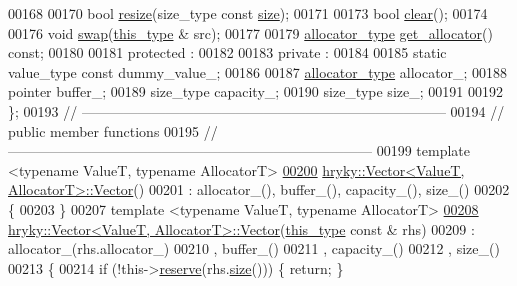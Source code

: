 \begin{DoxyCode}
00168 
00170     \textcolor{keywordtype}{bool} \hyperlink{classhryky_1_1_vector_a9148eb8972b43ed3a7e807d19be848a5}{resize}(size\_type \textcolor{keyword}{const} \hyperlink{classhryky_1_1_vector_a4bf9016a68dd7bf4967bf202b884a4fa}{size});
00171 
00173     \textcolor{keywordtype}{bool} \hyperlink{classhryky_1_1_vector_a674ecb00d223d91ba58bb45540be9983}{clear}();
00174 
00176     \textcolor{keywordtype}{void} \hyperlink{classhryky_1_1_vector_abcf365626457abf95d05b0a736e7a60a}{swap}(\hyperlink{classhryky_1_1_vector}{this_type} & src);
00177 
00179     \hyperlink{classhryky_1_1allocator_1_1_heap}{allocator_type} \hyperlink{classhryky_1_1_vector_a435d9e9b71aaf09e9281e671742ba2e0}{get_allocator}() \textcolor{keyword}{const};
00180 
00181 \textcolor{keyword}{protected} :
00182 
00183 \textcolor{keyword}{private} :
00184 
00185     \textcolor{keyword}{static} value\_type \textcolor{keyword}{const} dummy\_value\_;
00186 
00187     \hyperlink{classhryky_1_1allocator_1_1_heap}{allocator_type}      allocator\_;
00188     pointer             buffer\_;
00189     size\_type           capacity\_;
00190     size\_type           size\_;
00191 
00192 \};
00193 \textcolor{comment}{//
      ------------------------------------------------------------------------------}
00194 \textcolor{comment}{// public member functions}
00195 \textcolor{comment}{//
      ------------------------------------------------------------------------------}
00199 \textcolor{comment}{}\textcolor{keyword}{template} <\textcolor{keyword}{typename} ValueT, \textcolor{keyword}{typename} AllocatorT>
\hypertarget{vector_8h_source_l00200}{}\hyperlink{classhryky_1_1_vector_abe97d2779dcc79a8d599dbd8ff66451b}{00200} \hyperlink{classhryky_1_1_vector_abe97d2779dcc79a8d599dbd8ff66451b}{hryky::Vector<ValueT, AllocatorT>::Vector}()
00201     : allocator\_(), buffer\_(), capacity\_(), size\_()
00202 \{
00203 \}
00207 \textcolor{keyword}{template} <\textcolor{keyword}{typename} ValueT, \textcolor{keyword}{typename} AllocatorT>
\hypertarget{vector_8h_source_l00208}{}\hyperlink{classhryky_1_1_vector_add56505400891e26f0b370ed65bb1797}{00208} \hyperlink{classhryky_1_1_vector}{hryky::Vector<ValueT, AllocatorT>::Vector}(\hyperlink{classhryky_1_1_vector}{this_type} \textcolor{keyword}{const} & rhs)
00209     : allocator\_(rhs.allocator\_)
00210       , buffer\_()
00211       , capacity\_()
00212       , size\_()
00213 \{
00214     \textcolor{keywordflow}{if} (!this->\hyperlink{classhryky_1_1_vector_a4d2a2874dcc88826b45782d4b1b73051}{reserve}(rhs.\hyperlink{classhryky_1_1_vector_a4bf9016a68dd7bf4967bf202b884a4fa}{size}())) \{ \textcolor{keywordflow}{return}; \}

\end{DoxyCode}
